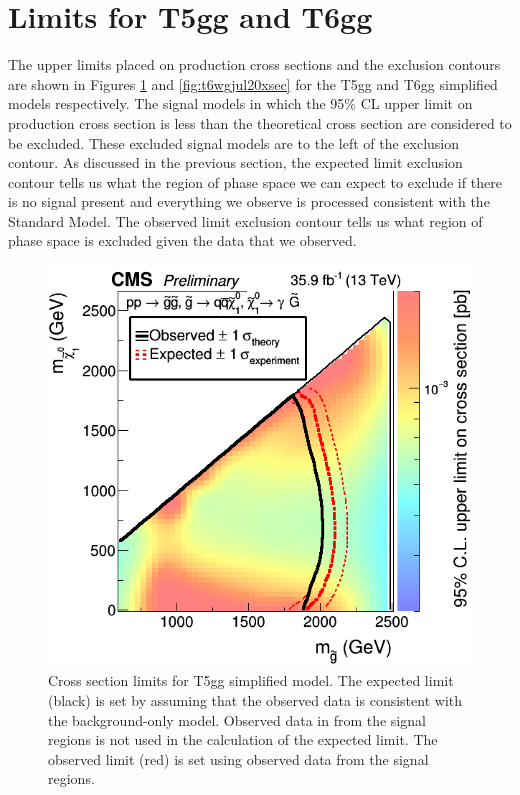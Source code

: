 \section{Limits for T5gg and T6gg}
The upper limits placed on production cross sections and the exclusion contours are shown in Figures \ref{fig:t5wgjul20xsec} and \ref{fig:t6wgjul20xsec} for the T5gg and T6gg simplified models respectively.  The signal models in which the 95\% CL upper limit on production cross section is less than the theoretical cross section are considered to be excluded.  These excluded signal models are to the left of the exclusion contour.  As discussed in the previous section, the expected limit exclusion contour tells us what the region of phase space we can expect to exclude if there is no signal present and everything we observe is processed consistent with the Standard Model.  The observed limit exclusion contour tells us what region of phase space is excluded given the data that we observed.
\begin{figure}[h]
	\centering
	\includegraphics[width=0.9\linewidth]{Figures/T5limit_sept30}
	\caption[Cross section limits for T5gg simplified model.]{Cross section limits for T5gg simplified model.  The expected limit (black) is set by assuming that the observed data is consistent with the background-only model.  Observed data in from the signal regions is not used in the calculation of the expected limit.  The observed limit (red) is set using observed data from the signal regions.}
	\label{fig:t5wgjul20xsec}
\end{figure}
